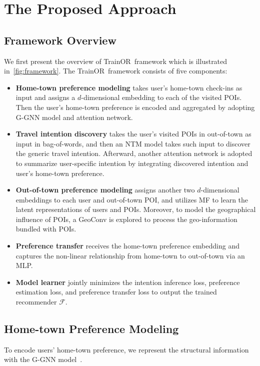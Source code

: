\documentclass[letterpaper]{article} %
\newcommand{\ourmodel}{{\sc TrainOR}}
\begin{document}
\section{The Proposed Approach}

\subsection{Framework Overview}
We first present the overview of \ourmodel~framework which is illustrated in~\cref{fig:framework}.
The \ourmodel ~framework consists of five components: 

\begin{itemize}
    \item 
    {\bf Home-town preference modeling} 
    takes user's home-town check-ins as input and assigns a $d$-dimensional embedding to each of the visited POIs. 
    Then the user's home-town preference is encoded and aggregated by adopting G-GNN model and attention network.
    \item 
    {\bf Travel intention discovery} 
    takes the user's visited POIs in out-of-town as input in bag-of-words, and then an NTM model takes such input to discover the generic travel intention.
    Afterward, another attention network is adopted to summarize user-specific intention by integrating discovered intention and user's home-town preference. 
    \item 
    {\bf Out-of-town preference modeling} 
    assigns another two $d$-dimensional embeddings to each user and  out-of-town POI, and utilizes MF to learn the latent representations of users and POIs.
    Moreover, to model the geographical influence of POIs, a GeoConv is explored to process the geo-information bundled with POIs. 
    \item 
    {\bf Preference transfer} 
    receives the home-town preference embedding and captures the non-linear relationship from home-town to out-of-town via an MLP. 
    \item 
    {\bf Model learner} jointly minimizes the intention inference loss, preference estimation loss, and preference transfer loss to output the trained recommender $ \mathcal{F} $.
\end{itemize}


\subsection{Home-town Preference Modeling}
To encode users' home-town preference, we represent the structural information with the G-GNN model~\cite{wu2019session,li2015gated}.
\end{document}
